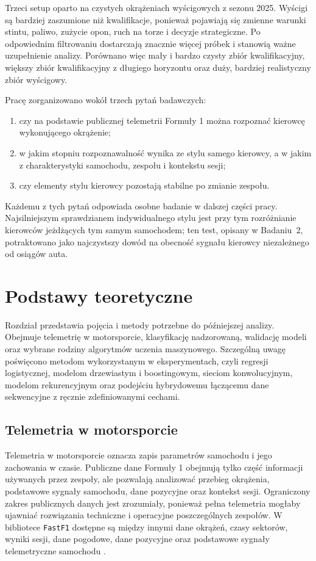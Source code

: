 \documentclass[printmode,pl]{mgr}
\begin{document}
Trzeci setup oparto na czystych okrążeniach wyścigowych z sezonu 2025. Wyścigi są bardziej zaszumione niż kwalifikacje, ponieważ pojawiają się zmienne warunki stintu, paliwo, zużycie opon, ruch na torze i decyzje strategiczne. Po odpowiednim filtrowaniu dostarczają znacznie więcej próbek i stanowią ważne uzupełnienie analizy. Porównano więc mały i bardzo czysty zbiór kwalifikacyjny, większy zbiór kwalifikacyjny z długiego horyzontu oraz duży, bardziej realistyczny zbiór wyścigowy.

Pracę zorganizowano wokół trzech pytań badawczych:
\begin{enumerate}
    \item czy na podstawie publicznej telemetrii Formuły 1 można rozpoznać kierowcę wykonującego okrążenie;
    \item w jakim stopniu rozpoznawalność wynika ze stylu samego kierowcy, a w jakim z charakterystyki samochodu, zespołu i kontekstu sesji;
    \item czy elementy stylu kierowcy pozostają stabilne po zmianie zespołu.
\end{enumerate}
Każdemu z tych pytań odpowiada osobne badanie w dalszej części pracy. Najsilniejszym sprawdzianem indywidualnego stylu jest przy tym rozróżnianie kierowców jeżdżących tym samym samochodem; ten test, opisany w Badaniu~2, potraktowano jako najczystszy dowód na obecność sygnału kierowcy niezależnego od osiągów auta.


\chapter{Podstawy teoretyczne}

Rozdział przedstawia pojęcia i metody potrzebne do późniejszej analizy. Obejmuje telemetrię w motorsporcie, klasyfikację nadzorowaną, walidację modeli oraz wybrane rodziny algorytmów uczenia maszynowego. Szczególną uwagę poświęcono metodom wykorzystanym w eksperymentach, czyli regresji logistycznej, modelom drzewiastym i boostingowym, sieciom konwolucyjnym, modelom rekurencyjnym oraz podejściu hybrydowemu łączącemu dane sekwencyjne z ręcznie zdefiniowanymi cechami.


\section{Telemetria w motorsporcie}

Telemetria w motorsporcie oznacza zapis parametrów samochodu i jego zachowania w czasie. Publiczne dane Formuły 1 obejmują tylko część informacji używanych przez zespoły, ale pozwalają analizować przebieg okrążenia, podstawowe sygnały samochodu, dane pozycyjne oraz kontekst sesji. Ograniczony zakres publicznych danych jest zrozumiały, ponieważ pełna telemetria mogłaby ujawniać rozwiązania techniczne i operacyjne poszczególnych zespołów. W bibliotece \texttt{FastF1} dostępne są między innymi dane okrążeń, czasy sektorów, wyniki sesji, dane pogodowe, dane pozycyjne oraz podstawowe sygnały telemetryczne samochodu \cite{fastf1_docs}.
\end{document}
